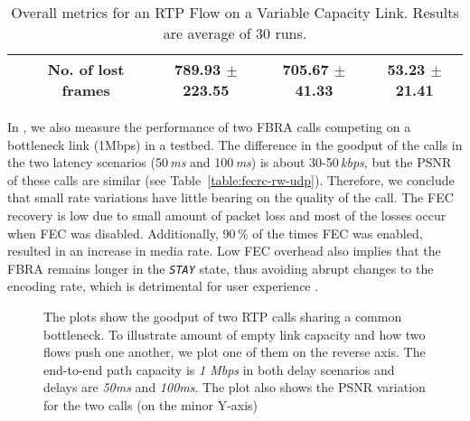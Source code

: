 \begin{table}
{\begin{tabular}{c c c c c}
  & \textbf{No. of lost frames} & 789.93 $\pm$223.55 & 705.67 $\pm$41.33 & 53.23  $\pm$21.41 \\ \hline
  \end{tabular}
  }
  \caption{Overall metrics for an RTP Flow on a Variable Capacity Link.
  Results are average of 30 runs.}
  \label{table:fecrc-var-res}
\end{table}

In , we also measure the performance of two FBRA calls
competing on a bottleneck link (1Mbps) in a testbed. The difference in the
goodput of the calls in the two latency scenarios (50\,\emph{ms} and
100\,\emph{ms}) is about 30-50\,\emph{kbps}, but the PSNR of these calls are
similar (see Table~\ref{table:fecrc-rw-udp}). Therefore, we conclude that
small rate variations have little bearing on the quality of the call. The FEC
recovery is low due to small amount of packet loss and most of the losses
occur when FEC was disabled. Additionally, 90\,\% of the times FEC was
enabled, resulted in an increase in media rate. Low FEC overhead also implies
that the FBRA remains longer in the \texttt{\emph{STAY}} state, thus avoiding
abrupt changes to the encoding rate, which is detrimental for user experience
\cite{Zink03subjectiveimpression}.



\begin{figure}
  \centerline{
}
\caption{The plots show the goodput of two RTP calls sharing a common
bottleneck. To illustrate amount of empty link capacity and how two flows push
one another, we plot one of them on the reverse axis. The end-to-end path
capacity is \emph{1 Mbps} in both delay scenarios and delays are \emph{50ms}
and \emph{100ms}. The plot also shows the PSNR variation for the two calls (on
the minor Y-axis)}
\label{fig:fecrc-dnet}
\end{figure}


